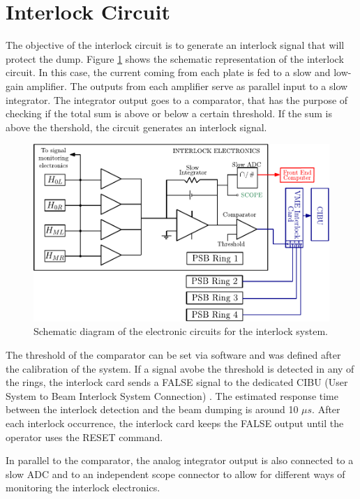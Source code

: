 \section{Interlock Circuit}

The objective of the interlock circuit is to generate an interlock signal that will protect the \hzhm dump. Figure \ref{fig:InterlockCir} shows the schematic representation of the interlock circuit. In this case, the current coming from each plate is fed to a slow and low-gain amplifier. The outputs from each amplifier serve as parallel input to a slow integrator. The integrator output goes to a comparator, that has the purpose of checking if the total sum is above or below a certain threshold. If the sum is above the thershold, the circuit generates an interlock signal. 

\begin{figure}[h]
    \centering
    \includegraphics[width=0.8\columnwidth]{Figure_ElectronicSchema/InterlockElectronics.pdf}
    \caption{Schematic diagram of the electronic circuits for the interlock system.}
    \label{fig:InterlockCir}
\end{figure}

The threshold of the comparator can be set via software and was defined after the calibration of the system. If a signal avobe the threshold is detected in any of the rings, the interlock card sends a FALSE signal to the dedicated CIBU (User System to Beam Interlock System Connection) \parencite[][]{ref:CIBU}. The estimated response time between the interlock detection and the beam dumping is around 10 $\mu s$. After each interlock occurrence, the interlock card keeps the FALSE output until the operator uses the RESET command. 

In parallel to the comparator, the analog integrator output is also connected to a slow ADC and to an independent scope connector to allow for different ways of monitoring the interlock electronics. 

